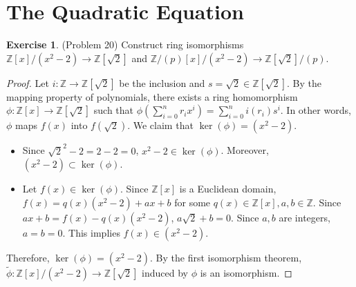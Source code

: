 \documentclass[12pt, psamsfonts]{amsart}
\theoremstyle{definition}
\newtheorem*{exer}{Exercise}
\theoremstyle{remark}
\numberwithin{equation}{section}
\begin{document}
\section{The Quadratic Equation}

\begin{exer}{(Problem 20)}
  Construct ring isomorphisms $\mathbb{Z}[x]/(x^2 - 2) \rightarrow \mathbb{Z}[\sqrt{2}]$ and $\mathbb{Z}/(p)[x]/(x^2 - 2) \rightarrow \mathbb{Z}[\sqrt{2}]/(p)$.
\end{exer}

\begin{proof}
  Let $i: \mathbb{Z} \rightarrow \mathbb{Z}[\sqrt{2}]$ be the inclusion and $s = \sqrt{2} \in \mathbb{Z}[\sqrt{2}]$.
  By the mapping property of polynomials, there exists a ring homomorphism $\phi: \mathbb{Z}[x] \rightarrow \mathbb{Z}[\sqrt{2}]$ such that $\phi(\sum_{i=0}^{n} r_ix^i) = \sum_{i=0}^{n} i(r_i)s^i$.
  In other words, $\phi$ maps $f(x)$ into $f(\sqrt{2})$.
  We claim that $\ker(\phi) = (x^2 - 2)$.
  \begin{itemize}
    \item
      Since $\sqrt{2}^2 - 2 = 2 - 2 = 0$, $x^2 - 2 \in \ker(\phi)$.
      Moreover, $(x^2 - 2) \subset \ker(\phi)$.
    \item
      Let $f(x) \in \ker(\phi)$.
      Since $\mathbb{Z}[x]$ is a Euclidean domain, $f(x) = q(x)(x^2 - 2) + ax + b$ for some $q(x) \in \mathbb{Z}[x], a, b \in \mathbb{Z}$.
      Since $ax + b = f(x) - q(x)(x^2 - 2)$, $a\sqrt{2} + b = 0$.
      Since $a, b$ are integers, $a = b = 0$.
      This implies $f(x) \in (x^2 - 2)$.
  \end{itemize}
  Therefore, $\ker(\phi) = (x^2 - 2)$.
  By the first isomorphism theorem, $\tilde{\phi} : \mathbb{Z}[x]/(x^2 - 2) \rightarrow \mathbb{Z}[\sqrt{2}]$ induced by $\phi$ is an isomorphism.


\end{proof}
\end{document}
